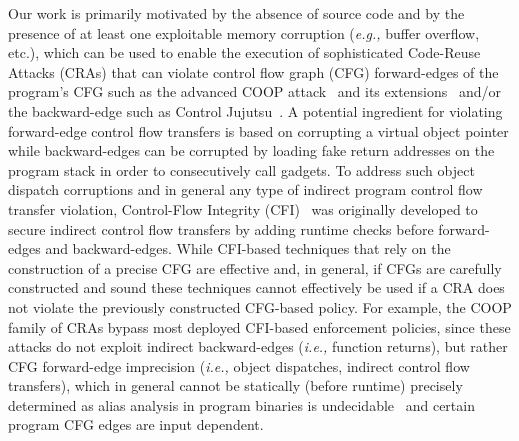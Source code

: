 Our work is primarily motivated by the absence of source code and by the presence of at least one exploitable
memory corruption (\textit{e.g.,} buffer overflow, etc.), which can be used to enable the execution of sophisticated Code-Reuse Attacks 
(CRAs) that can violate control flow graph (CFG) forward-edges 
of the program's CFG such as the advanced COOP attack~\cite{schuster:coop} and its 
extensions~\cite{crane:readactor++, subversive-c:lettner, ctf:coop, loop:oriented} and/or the backward-edge such as Control Jujutsu~\cite{jujutsu}. 
A potential ingredient for violating forward-edge control flow transfers is based on corrupting a virtual object pointer 
while backward-edges can be corrupted by loading fake return addresses on the program stack in order to consecutively call gadgets.
To address such object dispatch corruptions
and in general any type of indirect program control flow transfer violation, Control-Flow Integrity (CFI)~\cite{abadi:cfi2, abadi:cfi} 
was originally developed to secure indirect control flow transfers by adding runtime checks before forward-edges and backward-edges. 
While CFI-based techniques that rely on the construction of a precise CFG are effective \cite{cfi:survey} and, in general, if CFGs are carefully constructed and 
sound \cite{cfg:sound} these techniques cannot effectively be used if a CRA does not violate the previously constructed CFG-based policy.
For example, the COOP family of CRAs bypass most deployed CFI-based enforcement policies, since 
these attacks do not exploit indirect backward-edges (\textit{i.e.,} function returns), but rather CFG
forward-edge imprecision (\textit{i.e.,} object dispatches, indirect control flow transfers), which in general cannot be 
statically (before runtime) precisely determined 
as alias analysis in program binaries is undecidable~\cite{alias:undecidable} and certain program CFG edges are input dependent.

